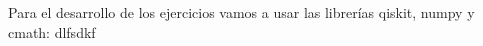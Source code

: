 \documentclass[11pt]{article}
\begin{document}
	

	Para el desarrollo de los ejercicios vamos a usar las librerías qiskit, numpy y cmath:
\newpage
	dlfsdkf
\end{document}
